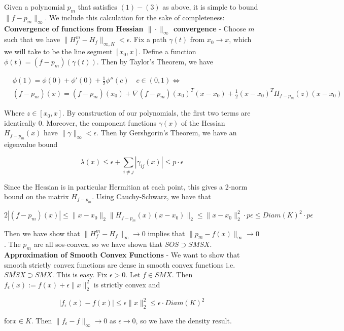\documentclass[11pt,reqno]{amsart}
\theoremstyle{definition}
\numberwithin{equation}{section}
\newcommand{\eps}{\epsilon}
\newcommand{\tb}{\textbf}
\begin{document}
Given a polynomial $p_m$ that satisfies $(1) - (3)$ as above, it is simple to bound $\|f - p_m \|_{\infty}$. We include this calculation for the sake of completeness: \\

\tb{Convergence of functions from Hessian $\| \cdot \|_{\infty}$ convergence} - Choose $m$ such that we have $\|H_f^m - H_f \|_{\infty, K} < \eps$. Fix a path $\gamma(t)$ from $x_0 \to x$, which we will take to be the line segment $[x_0, x]$.  Define a function $\phi(t) = (f - p_m)(\gamma(t))$. Then by Taylor's Theorem, we have 

\begin{align*} 
&\phi(1) = \phi(0) + \phi'(0) + \frac{1}{2} \phi''(c) \quad c \in (0,1) \iff \\
& (f - p_m)(x) = (f-p_m)(x_0) + \nabla (f - p_m)(x_0)^T(x - x_0) + \frac{1}{2} (x - x_0)^T H_{f - p_m}(z) (x - x_0) 
\end{align*} 

Where $z \in [x_0, x]$. By construction of our polynomials, the first two terms are identically 0. Moreover, the component functions $\gamma(x)$ of the Hessian $H_{f - p_m}(x)$ have $\|\gamma\|_{\infty} < \eps$. Then by Gershgorin's Theorem, we have an eigenvalue bound

\[
\lambda(x) \leq \eps + \sum_{i \not = j} |\gamma_{ij}(x)| \leq p \cdot \eps
\]

Since the Hessian is in particular Hermitian at each point, this gives a 2-norm bound on the matrix $H_{f-p_m}$. Using Cauchy-Schwarz, we have that 

\[
2 |(f - p_m)(x)| \leq \|x - x_0 \|_2 \|H_{f - p_m}(x)(x - x_0)\|_2 \leq \|x - x_0\|_2^2 \cdot p \eps \leq Diam(K)^2 \cdot p \eps
\]

Then we have show that $\|H_f^m- H_f \|_{\infty} \to 0$ implies that $\|p_m - f(x) \|_{\infty} \to 0$. The $p_m$ are all sos-convex, so we have shown that $\overline{SOS} \supset SMSX$. \\

\tb{Approximation of Smooth Convex Functions} - We want to show that smooth strictly convex functions are dense in smooth convex functions i.e. $ \overline{SMSX} \supset SMX$. This is easy. Fix $\eps > 0$. Let $f \in SMX$. Then $f_{\eps}(x) := f(x) + \eps \|x \|_2^2$ is strictly convex and 

\[
|f_{\eps}(x) - f(x)| \leq \eps \|x\|_2^2 \leq \eps \cdot Diam(K)^2
\]

for$x \in K$. Then $\|f_{\eps} - f\|_{\infty} \to 0$ as $\eps \to 0$, so we have the density result. \\
\end{document}

